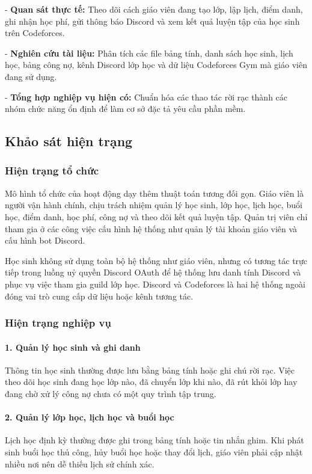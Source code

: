 \documentclass[12pt,a4paper]{article}
\begin{document}
- \textbf{Quan sát thực tế:} Theo dõi cách giáo viên đang tạo lớp, lập lịch,
điểm danh, ghi nhận học phí, gửi thông báo Discord và xem kết quả luyện tập của
học sinh trên Codeforces.

- \textbf{Nghiên cứu tài liệu:} Phân tích các file bảng tính, danh sách học
sinh, lịch học, bảng công nợ, kênh Discord lớp học và dữ liệu Codeforces Gym mà
giáo viên đang sử dụng.

- \textbf{Tổng hợp nghiệp vụ hiện có:} Chuẩn hóa các thao tác rời rạc thành
các nhóm chức năng ổn định để làm cơ sở đặc tả yêu cầu phần mềm.

\subsection{Khảo sát hiện trạng}

\subsubsection{Hiện trạng tổ chức}

Mô hình tổ chức của hoạt động dạy thêm thuật toán tương đối gọn. Giáo viên là
người vận hành chính, chịu trách nhiệm quản lý học sinh, lớp học, lịch học, buổi
học, điểm danh, học phí, công nợ và theo dõi kết quả luyện tập. Quản trị viên
chỉ tham gia ở các công việc cấu hình hệ thống như quản lý tài khoản giáo viên
và cấu hình bot Discord.

Học sinh không sử dụng toàn bộ hệ thống như giáo viên, nhưng có tương tác trực
tiếp trong luồng uỷ quyền Discord OAuth để hệ thống lưu danh tính Discord và
phục vụ việc tham gia guild lớp học. Discord và Codeforces là hai hệ thống ngoài
đóng vai trò cung cấp dữ liệu hoặc kênh tương tác.

\subsubsection{Hiện trạng nghiệp vụ}

\paragraph{1. Quản lý học sinh và ghi danh}
Thông tin học sinh thường được lưu bằng bảng tính hoặc ghi chú rời rạc. Việc
theo dõi học sinh đang học lớp nào, đã chuyển lớp khi nào, đã rút khỏi lớp hay
đang chờ xử lý công nợ chưa có một quy trình tập trung.

\paragraph{2. Quản lý lớp học, lịch học và buổi học}
Lịch học định kỳ thường được ghi trong bảng tính hoặc tin nhắn ghim. Khi phát
sinh buổi học thủ công, hủy buổi học hoặc thay đổi lịch, giáo viên phải cập
nhật nhiều nơi nên dễ thiếu lịch sử chính xác.
\end{document}

